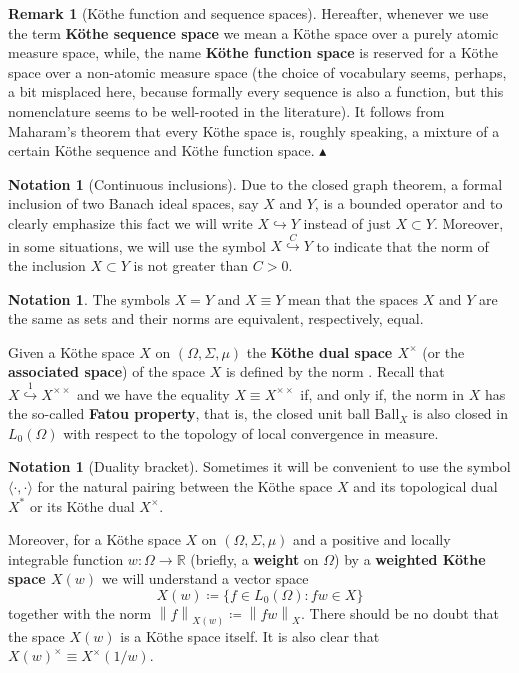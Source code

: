 \documentclass[11pt]{amsart}
\theoremstyle{definition}
\theoremstyle{definition}
\theoremstyle{definition}
\theoremstyle{definition}
\theoremstyle{definition}
\theoremstyle{definition}
\newtheorem{remark}[theorem]{Remark}
\theoremstyle{definition}
\theoremstyle{definition}
\numberwithin{equation}{section}
\numberwithin{equation}{section}
\numberwithin{equation}{section}
\theoremstyle{definition}
\theoremstyle{definition}
\newtheorem{notation}[theorem]{Notation}
\theoremstyle{definition}
\theoremstyle{definition}
\theoremstyle{definition}
\theoremstyle{definition}
\newcommand{\norm}[1]{\left\lVert#1\right\rVert}
\newcommand\xqed[1]{%
	\leavevmode\unskip\penalty9999 \hbox{}\nobreak\hfill
	\quad\hbox{#1}}
\newcommand\demo{\xqed{{\Large $\blacktriangle$}}}
\begin{document}
\begin{remark}[K{\" o}the function and sequence spaces]
	Hereafter, whenever we use the term {\bf K{\" o}the sequence space} we mean a K{\" o}the space over a purely atomic measure space, while, the name
	{\bf K{\" o}the function space} is reserved for a K{\" o}the space over a non-atomic measure space (the choice of vocabulary
	seems, perhaps, a bit misplaced here, because formally every sequence is also a function, but this nomenclature seems to be
	well-rooted in the literature).
	It follows from Maharam's theorem that every K{\" o}the space is, roughly speaking, a mixture
	of a certain K{\" o}the sequence and K{\" o}the function space.
	\demo
\end{remark}

\begin{notation}[Continuous inclusions]
	Due to the closed graph theorem, a formal inclusion of two Banach ideal spaces, say $X$ and $Y$, is a bounded operator and to clearly
	emphasize this fact we will write $X \hookrightarrow Y$ instead of just $X \subset Y$. Moreover, in some situations, we will use the
	symbol $X \overset{C}{\hookrightarrow} Y$ to indicate that the norm of the inclusion $X \subset Y$ is not greater than $C > 0$.
\end{notation}

\begin{notation}
	The symbols $X = Y$ and $X \equiv Y$ mean that the spaces $X$ and $Y$ are the same as sets and their norms are equivalent, respectively, equal.
\end{notation}

Given a K{\" o}the space $X$ on $(\Omega,\Sigma,\mu)$ the {\bf K{\" o}the dual space $X^{\times}$}
(or the {\bf associated space}) of the space $X$ is defined by the norm .
Recall that $X \overset{1}{\hookrightarrow} X^{\times \times}$ and we have the equality $X \equiv X^{\times \times}$ if, and only if, the norm in $X$
has the so-called {\bf Fatou property}, that is, the closed unit ball $\text{Ball}_X$ is also closed in $L_0(\Omega)$
with respect to the topology of local convergence in measure.

\begin{notation}[Duality bracket]
	Sometimes it will be convenient to use the symbol $\langle \cdot, \cdot \rangle$ for the natural pairing between the K{\" o}the space $X$ and its
	topological dual $X^*$ or its K{\" o}the dual $X^{\times}$.
\end{notation}

Moreover, for a K{\" o}the space $X$ on $(\Omega,\Sigma,\mu)$ and a positive and locally integrable function $w \colon \Omega \rightarrow \mathbb{R}$
(briefly, a {\bf weight} on $\Omega$) by a {\bf weighted K{\" o}the space $X(w)$} we will understand a vector space
\begin{equation*}
	X(w) \coloneqq \{f \in L_0(\Omega) \colon fw \in X\}
\end{equation*}
together with the norm $\norm{f}_{X(w)} \coloneqq \norm{fw}_X$. There should be no doubt that the space $X(w)$ is a K{\" o}the space itself.
It is also clear that $X(w)^{\times} \equiv X^{\times}(1/w)$.
\end{document}
